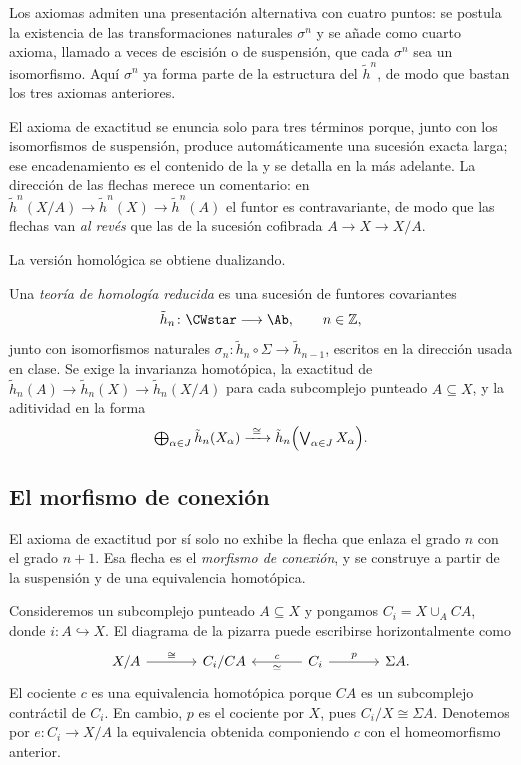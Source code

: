 \begin{nota}
   Los axiomas admiten una presentación alternativa con cuatro puntos: se postula la existencia de las transformaciones naturales $\sigma^n$ y se añade como cuarto axioma, llamado a veces de escisión o de suspensión, que cada $\sigma^n$ sea un isomorfismo. Aquí $\sigma^n$ ya forma parte de la estructura del $\tilde h^n$, de modo que bastan los tres axiomas anteriores.
\end{nota}

El axioma de exactitud se enuncia solo para tres términos porque, junto con los isomorfismos de suspensión, produce automáticamente una sucesión exacta larga; ese encadenamiento es el contenido de la  y se detalla en la  más adelante. La dirección de las flechas merece un comentario: en $\tilde h^n(X/A)\to\tilde h^n(X)\to\tilde h^n(A)$ el funtor es contravariante, de modo que las flechas van \emph{al revés} que las de la sucesión cofibrada $A\to X\to X/A$.

La versión homológica se obtiene dualizando.

\begin{defi}\label{defi:homologia-reducida}
Una \emph{teoría de homología reducida} es una sucesión de funtores covariantes
\[
\tilde h_n\colon\CWstar\longrightarrow\Ab,
\qquad n\in\mathbb Z,
\]
junto con isomorfismos naturales $\sigma_n\colon\tilde h_n\circ\Sigma\to\tilde h_{n-1}$, escritos en la dirección usada en clase. Se exige la invarianza homotópica, la exactitud de $\tilde h_n(A)\to\tilde h_n(X)\to\tilde h_n(X/A)$ para cada subcomplejo punteado $A\subseteq X$, y la aditividad en la forma
\[\textstyle
\bigoplus_{\alpha\in J}\tilde h_n(X_\alpha)\xrightarrow{\ \cong\ }\tilde h_n\Bigl(\bigvee_{\alpha\in J}X_\alpha\Bigr).
\]
\end{defi}

\subsection{El morfismo de conexión}

El axioma de exactitud por sí solo no exhibe la flecha que enlaza el grado $n$ con el grado $n+1$. Esa flecha es el \emph{morfismo de conexión}, y se construye a partir de la suspensión y de una equivalencia homotópica.

Consideremos un subcomplejo punteado $A\subseteq X$ y pongamos $C_i=X\cup_A CA$, donde $i\colon A\hookrightarrow X$. El diagrama de la pizarra puede escribirse horizontalmente como
\[
\begin{tikzcd}[column sep=large]
X/A \arrow[r,"\cong"] & C_i/CA & C_i \arrow[l,"c"',"\simeq"] \arrow[r,"p"] & \Sigma A.
\end{tikzcd}
\]
El cociente $c$ es una equivalencia homotópica porque $CA$ es un subcomplejo contráctil de $C_i$. En cambio, $p$ es el cociente por $X$, pues $C_i/X\cong\Sigma A$. Denotemos por $e\colon C_i\to X/A$ la equivalencia obtenida componiendo $c$ con el homeomorfismo anterior.

